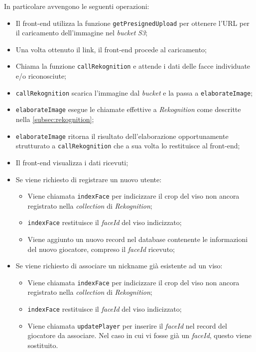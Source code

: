 	In particolare avvengono le seguenti operazioni:
	\begin{itemize}
		\item Il front-end utilizza la funzione \texttt{getPresignedUpload} per ottenere l'URL per il caricamento dell'immagine nel \emph{bucket} \emph{S3};
		\item Una volta ottenuto il link, il front-end procede al caricamento;
		\item Chiama la funzione \texttt{callRekognition} e attende i dati delle facce individuate e/o riconosciute;
		\item \texttt{callRekognition} scarica l'immagine dal \emph{bucket} e la passa a \texttt{elaborateImage};
		\item \texttt{elaborateImage} esegue le chiamate effettive a \emph{Rekognition} come descritte nella \autoref{subsec:rekognition};
		\item \texttt{elaborateImage} ritorna il risultato dell'elaborazione opportunamente strutturato a \texttt{callRekognition} che a sua volta lo restituisce al front-end;
		\item Il front-end visualizza i dati ricevuti;
		
		\item Se viene richiesto di registrare un nuovo utente:
		\begin{itemize}
			\item Viene chiamata \texttt{indexFace} per indicizzare il crop del viso non ancora registrato nella \emph{collection} di \emph{Rekognition};
			\item \texttt{indexFace} restituisce il \emph{faceId} del viso indicizzato; 
			\item Viene aggiunto un nuovo record nel database contenente le informazioni del nuovo giocatore, compreso il \emph{faceId} ricevuto;
		\end{itemize}
		
		\item Se viene richiesto di associare un nickname già esistente ad un viso:
		\begin{itemize}
				\item Viene chiamata \texttt{indexFace} per indicizzare il crop del viso non ancora registrato nella \emph{collection} di \emph{Rekognition};
			\item \texttt{indexFace} restituisce il \emph{faceId} del viso indicizzato; 
			\item Viene chiamata \texttt{updatePlayer} per inserire il \emph{faceId} nel record del giocatore da associare. Nel caso in cui vi fosse già un \emph{faceId}, questo viene sostituito.
		\end{itemize}
		
	\end{itemize}
	
